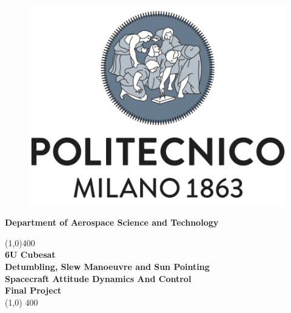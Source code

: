 \documentclass[11pt]{article}
\begin{document}



\begin{titlepage}

\begin{figure} [H]

\centering 

\includegraphics[scale=0.5]{poli.png}

\end{figure}

\begin{center}

\vspace{1cm}

\Large{\textbf{Department of Aerospace Science and Technology}}\\


\vfill

\line(1,0){400}\\[1mm]

\huge{\textbf{ 6U Cubesat\\Detumbling, Slew Manoeuvre and Sun Pointing}}\\ [3mm]

\Large{\textbf{ Spacecraft Attitude Dynamics And Control \\ Final Project}}\\ [1mm]

\line(1,0) {400}\\


\end{center}
\end{titlepage}
\end{document}

